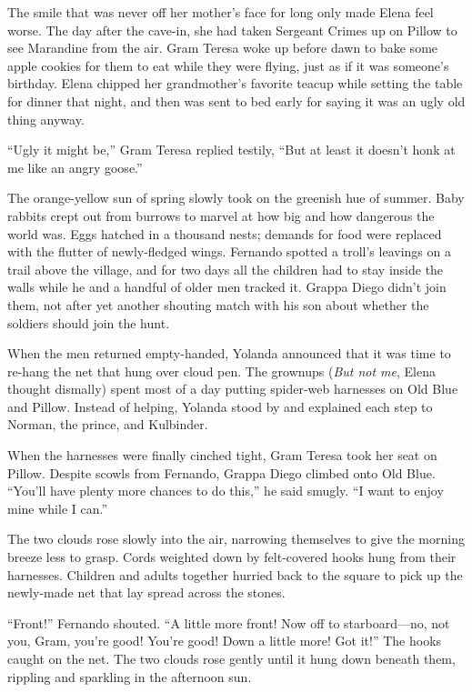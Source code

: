 \documentclass[10pt]{book}
\begin{document}
The smile that was never off her mother's face for long only made Elena feel worse. The day after the cave-in, she had taken Sergeant Crimes up on Pillow to see Marandine from the air. Gram Teresa woke up before dawn to bake some apple cookies for them to eat while they were flying, just as if it was someone's birthday. Elena chipped her grandmother's favorite teacup while setting the table for dinner that night, and then was sent to bed early for saying it was an ugly old thing anyway.

``Ugly it might be,'' Gram Teresa replied testily, ``But at least it doesn't honk at me like an angry goose.''

The orange-yellow sun of spring slowly took on the greenish hue of summer. Baby rabbits crept out from burrows to marvel at how big and how dangerous the world was.  Eggs hatched in a thousand nests; demands for food were replaced with the flutter of newly-fledged wings.  Fernando spotted a troll's leavings on a trail above the village, and for two days all the children had to stay inside the walls while he and a handful of older men tracked it.  Grappa Diego didn't join them, not after yet another shouting match with his son about whether the soldiers should join the hunt.

When the men returned empty-handed, Yolanda announced that it was time to re-hang the net that hung over cloud pen. The grownups (\emph{But not me}, Elena thought dismally) spent most of a day putting spider-web harnesses on Old Blue and Pillow. Instead of helping, Yolanda stood by and explained each step to Norman, the prince, and Kulbinder.

When the harnesses were finally cinched tight, Gram Teresa took her seat on Pillow. Despite scowls from Fernando, Grappa Diego climbed onto Old Blue. ``You'll have plenty more chances to do this,'' he said smugly. ``I want to enjoy mine while I can.''

The two clouds rose slowly into the air, narrowing themselves to give the morning breeze less to grasp. Cords weighted down by felt-covered hooks hung from their harnesses. Children and adults together hurried back to the square to pick up the newly-made net that lay spread across the stones.

``Front!'' Fernando shouted. ``A little more front! Now off to starboard---no, not you, Gram, you're good! You're good! Down a little more! Got it!'' The hooks caught on the net.  The two clouds rose gently until it hung down beneath them, rippling and sparkling in the afternoon sun.
\end{document}
